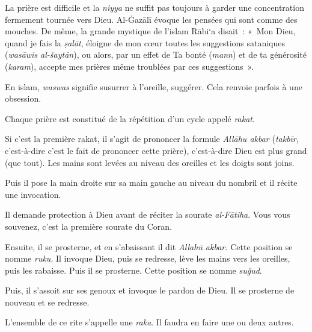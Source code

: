 La prière est difficile et la \emph{niyya} ne suffit pas toujours à
garder une concentration fermement tournée vers Dieu. Al-Ġazālī \label{theol:AlGazali13} évoque
les pensées qui sont comme des mouches. De même, la grande mystique de
l'islam Rābi`a disait~: «~Mon Dieu, quand je fais la \emph{ṣalāt},
éloigne de mon cœur toutes les suggestions sataniques (\emph{wasāwis
al-šaytān}), ou alors, par un effet de Ta bonté (\emph{mann}) et de ta
générosité (\emph{karam}), accepte mes prières même troublées par ces
suggestions~».

En islam, \emph{waswas} signifie susurrer à l'oreille, suggérer. Cela
renvoie parfois à une obsession.


Chaque prière est constitué de la répétition d'un cycle appelé
\emph{rakat}.

Si c'est la première rakat, il s'agit de prononcer la formule
\emph{Allāhu akbar} (\emph{takbīr,} c'est-à-dire c'est le fait de
prononcer cette prière), c'est-à-dire Dieu est plus grand (que tout).
Les mains sont levées au niveau des oreilles et les doigts sont joins.



Puis il pose la main droite sur sa main gauche au niveau du nombril et
il récite une invocation.

Il demande protection à Dieu avant de réciter la sourate
\emph{al-Fātiha}. Vous vous souvenez, c'est la première sourate du
Coran.

Ensuite, il se prosterne, et en s'abaissant il dit \emph{Allahū akbar.}
Cette position se nomme \emph{ruku}. Il invoque Dieu, puis se redresse,
lève les mains vers les oreilles, puis les rabaisse. Puis il se
prosterne. Cette position se nomme \emph{suǧud}.


Puis, il s'assoit sur ses genoux et invoque le pardon de Dieu. Il se
prosterne de nouveau et se redresse.

L'ensemble de ce rite s'appelle une \emph{raka}. Il faudra en faire une
ou deux autres.

